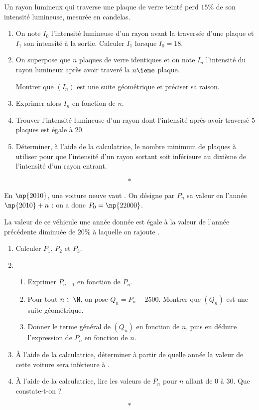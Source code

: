 \documentclass[12pt,openright,twoside,french]{book}
\begin{document}
\small


\exo
Un rayon lumineux qui traverse une plaque de verre teinté perd $15\%$ de son intensité lumineuse, mesurée en candelas.
\begin{enumerate}
	\item On note $I_0$ l'intensité lumineuse d'un rayon avant la traversée d'une plaque et $I_1$ son intensité à la sortie. Calculer $I_1$ lorsque $I_ 0 = 18$.
	\item On superpose que $n$ plaques de verre identiques et on note $I_n$ l'intensité du rayon lumineux après avoir traveré la $n\ieme$ plaque.\par
	Montrer que $\left(I_n\right)$ est une suite géométrique et préciser sa raison.
	\item Exprimer alors $I_n$ en fonction de $n$.
	\item Trouver l'intensité lumineuse d'un rayon dont l'intensité après avoir traversé $5$ plaques est égale à $20$.
	\item Déterminer, à l'aide de la calculatrice, le nombre minimum de plaques à utiliser pour que l'intensité d'un rayon sortant soit inférieure au dixième de l'intensité d'un rayon entrant.
\end{enumerate}\[*\]

\exo En $\np{2010}$, une voiture neuve vaut . On désigne par $P_n$ sa valeur en l'année $\np{2010} + n$ : on a donc $P_0 = \np{22000}$.\par
La valeur de ce véhicule une année donnée est égale à la valeur de l'année précédente diminuée de $20\%$ à laquelle on rajoute .

\begin{enumerate}
	\item Calculer $P_1$, $P_2$ et $P_3$.
	\item \begin{enumerate}
	      	\item Exprimer $P_{n+1}$ en fonction de $P_n$.
	      	\item Pour tout $n \in \N$, on pose $Q_n = P_n - 2500$. Montrer que $(Q_n)$ est une suite géométrique.
	      	\item Donner le terme général de $(Q_n)$ en fonction de $n$, puis en déduire l'expression de $P_n$ en fonction de $n$.
	      \end{enumerate}
	\item À l'aide de la calculatrice, déterminer à partir de quelle année la valeur de cette voiture sera inférieure à .
	\item À l'aide de la calculatrice, lire les valeurs de $P_n$ pour $n$ allant de $0$ à $30$. Que constate-t-on ?
\end{enumerate}\[*\]
\end{document}
